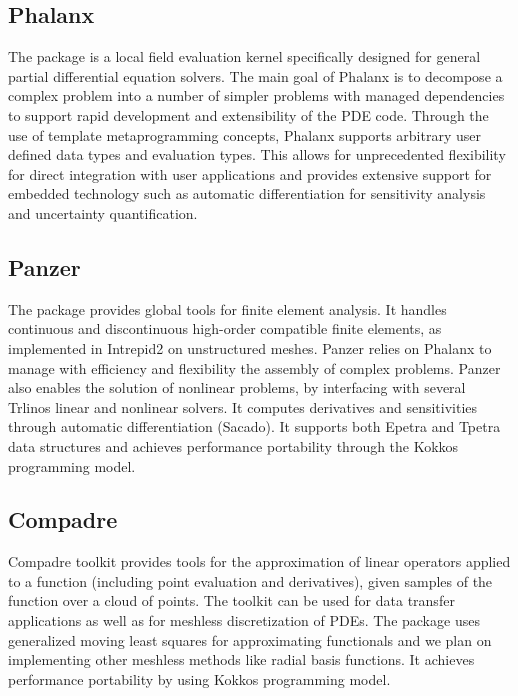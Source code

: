 \subsection{Phalanx}
The package is a local field evaluation kernel specifically designed for general partial differential equation solvers. The main goal of Phalanx is to decompose a complex problem into a number of simpler problems with managed dependencies to support rapid development and extensibility of the PDE code. Through the use of template metaprogramming concepts, Phalanx supports arbitrary user defined data types and evaluation types. This allows for unprecedented flexibility for direct integration with user applications and provides extensive support for embedded technology such as automatic differentiation for sensitivity analysis and uncertainty quantification.

\subsection{Panzer}
The package provides global tools for finite element analysis. It handles continuous and discontinuous high-order compatible finite elements, as implemented in Intrepid2 on unstructured meshes. Panzer relies on Phalanx to manage with efficiency and flexibility the assembly of complex problems. Panzer also enables the solution of nonlinear problems, by interfacing with several Trlinos linear and nonlinear solvers. It computes derivatives and sensitivities through automatic differentiation (Sacado). It supports both Epetra and Tpetra data structures and achieves performance portability through the Kokkos programming model.

\subsection{Compadre}
Compadre toolkit provides tools for the approximation of linear operators applied to a function (including point evaluation and derivatives), given samples of the function over a cloud of points. The toolkit can be used for data transfer applications as well as for meshless discretization of PDEs. The package uses generalized moving least squares for approximating functionals and we plan on implementing other meshless methods like radial basis functions. It achieves performance portability by using Kokkos programming model.


